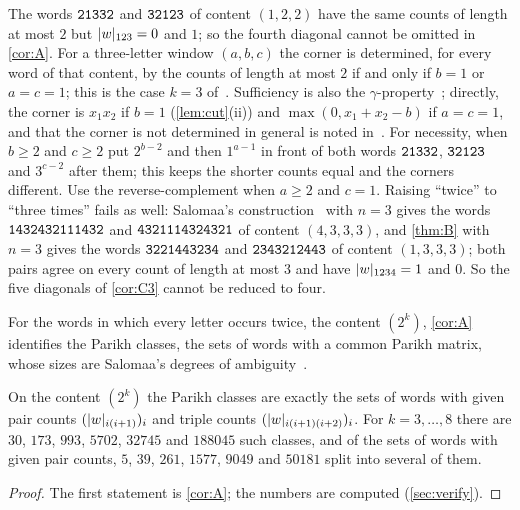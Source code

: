 \documentclass[11pt,a4paper]{article}
\begin{document}
\begin{example}\label{ex:fourth}
The words $\mathtt{21332}$ and $\mathtt{32123}$ of content $(1,2,2)$ have the same counts of length at most $2$ but $\lvert w\rvert_{123}=0$ and $1$; so the fourth diagonal cannot be omitted in \cref{cor:A}. For a three-letter window $(a,b,c)$ the corner is determined, for every word of that content, by the counts of length at most $2$ if and only if $b=1$ or $a=c=1$; this is the case $k=3$ of~\cite[Theorem~A(iii)]{Y26b}. Sufficiency is also the $\gamma$-property~\cite[Theorem~3]{Sal06}; directly, the corner is $x_1x_2$ if $b=1$ (\cref{lem:cut}(ii)) and $\max(0,x_1+x_2-b)$ if $a=c=1$, and that the corner is not determined in general is noted in~\cite[p.~226]{Sal06}. For necessity, when $b\ge2$ and $c\ge2$ put $2^{b-2}$ and then $1^{a-1}$ in front of both words $\mathtt{21332}$, $\mathtt{32123}$ and $3^{c-2}$ after them; this keeps the shorter counts equal and the corners different. Use the reverse-complement when $a\ge2$ and $c=1$. Raising ``twice'' to ``three times'' fails as well: Salomaa's construction~\cite[Lemma~3 and proof of Theorem~4]{Sal06} with $n=3$ gives the words $\mathtt{1432432111432}$ and $\mathtt{4321114324321}$ of content $(4,3,3,3)$, and \cref{thm:B} with $n=3$ gives the words $\mathtt{3221443234}$ and $\mathtt{2343212443}$ of content $(1,3,3,3)$; both pairs agree on every count of length at most $3$ and have $\lvert w\rvert_{1234}=1$ and $0$. So the five diagonals of \cref{cor:C3} cannot be reduced to four.
\end{example}

For the words in which every letter occurs twice, the content $(2^k)$, \cref{cor:A} identifies the Parikh classes, the sets of words with a common Parikh matrix, whose sizes are Salomaa's degrees of ambiguity~\cite[Definition~6, p.~109]{Sal18}.

\begin{corollary}\label{cor:doubled}
On the content $(2^k)$ the Parikh classes are exactly the sets of words with given pair counts $(\lvert w\rvert_{i(i+1)})_i$ and triple counts $(\lvert w\rvert_{i(i+1)(i+2)})_i$. For $k=3,\dots,8$ there are $30$, $173$, $993$, $5702$, $32745$ and $188045$ such classes, and of the sets of words with given pair counts, $5$, $39$, $261$, $1577$, $9049$ and $50181$ split into several of them.
\end{corollary}

\begin{proof}
The first statement is \cref{cor:A}; the numbers are computed (\cref{sec:verify}).
\end{proof}
\end{document}
